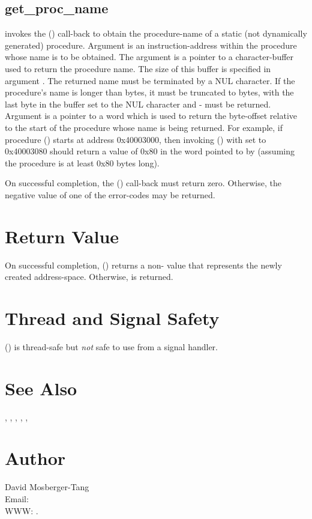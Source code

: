 \documentclass{article}
\begin{document}
\subsection{get\_proc\_name}

 invokes the () call-back to
obtain the procedure-name of a static (not dynamically generated)
procedure.  Argument  is an instruction-address within the
procedure whose name is to be obtained.  The  argument is a
pointer to a character-buffer used to return the procedure name.  The
size of this buffer is specified in argument .  The
returned name must be terminated by a NUL character.  If the
procedure's name is longer than  bytes, it must be
truncated to  bytes, with the last byte in the
buffer set to the NUL character and - must be
returned.  Argument  is a pointer to a word which is used to
return the byte-offset relative to the start of the procedure whose
name is being returned.  For example, if procedure () starts
at address 0x40003000, then invoking () with
 set to 0x40003080 should return a value of 0x80 in the word
pointed to by  (assuming the procedure is at least 0x80
bytes long).

On successful completion, the () call-back must
return zero.  Otherwise, the negative value of one of the
 error-codes may be returned.


\section{Return Value}

On successful completion, () returns a
non- value that represents the newly created
address-space.  Otherwise,  is returned.

\section{Thread and Signal Safety}

() is thread-safe but \emph{not}
safe to use from a signal handler.

\section{See Also}

,
,
,
,
,

\section{Author}

\noindent
David Mosberger-Tang\\
Email: \\
WWW: .
\LatexManEnd
\end{document}
